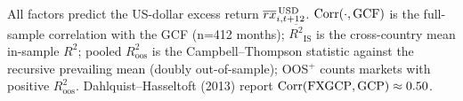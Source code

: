 \setlength{\tabcolsep}{5pt}
\\[0.8ex]
{\scriptsize\begin{minipage}{0.97\linewidth}
All factors predict the US-dollar excess return $\overline{rx}^{\,\mathrm{USD}}_{i,t+12}$. $\operatorname{Corr}(\cdot,\mathrm{GCF})$ is the full-sample correlation with the GCF (n=412 months); $\overline{R^2}_{\text{IS}}$ is the cross-country mean in-sample $R^2$; pooled $R^2_{\text{oos}}$ is the Campbell--Thompson statistic against the recursive prevailing mean (doubly out-of-sample); OOS$^{+}$ counts markets with positive $R^2_{\text{oos}}$. Dahlquist--Hasseltoft (2013) report $\operatorname{Corr}(\text{FXGCP},\mathrm{GCP})\approx0.50$.
\end{minipage}}
